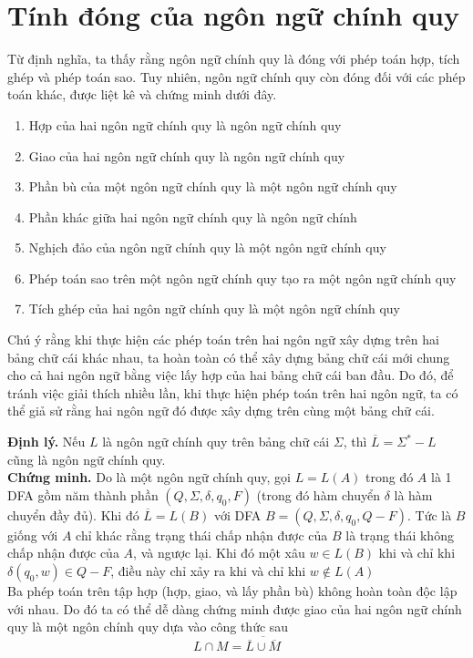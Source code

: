 \documentclass[14pt]{extreport}
\begin{document}
\section{Tính đóng của ngôn ngữ chính quy}
Từ định nghĩa, ta thấy rằng ngôn ngữ chính quy là đóng với phép toán hợp, tích ghép và phép toán sao. Tuy nhiên, ngôn ngữ chính quy còn đóng đối với các phép toán khác, được liệt kê và chứng minh dưới đây.
\begin{enumerate}
\item Hợp của hai ngôn ngữ chính quy là ngôn ngữ chính quy
\item Giao của hai ngôn ngữ chính quy là ngôn ngữ chính quy
\item Phần bù của một ngôn ngữ chính quy là một ngôn ngữ chính quy
\item Phần khác giữa hai ngôn ngữ chính quy là ngôn ngữ chính
\item Nghịch đảo của ngôn ngữ chính quy là một ngôn ngữ chính quy
\item Phép toán sao trên một ngôn ngữ chính quy tạo ra một ngôn ngữ chính quy
\item Tích ghép của hai ngôn ngữ chính quy là một ngôn ngữ chính quy
\end{enumerate}

Chú ý rằng khi thực hiện các phép toán trên hai ngôn ngữ xây dựng trên hai bảng chữ cái khác nhau, ta hoàn toàn có thể xây dựng bảng chữ cái mới chung cho cả hai ngôn ngữ bằng việc lấy hợp của hai bảng chữ cái ban đầu. Do đó, để tránh việc giải thích nhiều lần, khi thực hiện phép toán trên hai ngôn ngữ, ta có thể giả sử rằng hai ngôn ngữ đó được xây dựng trên cùng một bảng chữ cái.

\textbf{Định lý.} Nếu $L$ là ngôn ngữ chính quy trên bảng chữ cái $\Sigma$, thì $\overline{L} = \Sigma^* - L$ cũng là ngôn ngữ chính quy. \\

\textbf{Chứng minh.} Do là một ngôn ngữ chính quy, gọi $L = L(A)$ trong đó $A$ là 1 DFA gồm năm thành phần $(Q, \Sigma, \delta, q_0, F)$ (trong đó hàm chuyển $\delta$ là hàm chuyển đầy đủ). Khi đó $\overline{L} = L(B)$ với DFA $B = (Q, \Sigma, \delta, q_0, Q -F)$. Tức là $B$ giống với $A$ chỉ khác rằng trạng thái chấp nhận được của $B$ là trạng thái không chấp nhận được của $A$, và ngược lại. Khi đó một xâu $w \in L(B)$ khi và chỉ khi $\delta(q_0, w) \in Q-F$, điều này chỉ xảy ra khi và chỉ khi $w \notin L(A)$ \\

Ba phép toán trên tập hợp (hợp, giao, và lấy phần bù) không hoàn toàn độc lập với nhau. Do đó ta có thể dễ dàng chứng minh được giao của hai ngôn ngữ chính quy là một ngôn chính quy dựa vào công thức sau
$$L \cap M = \overline{\overline{L} \cup \overline{M}}$$
\end{document}
